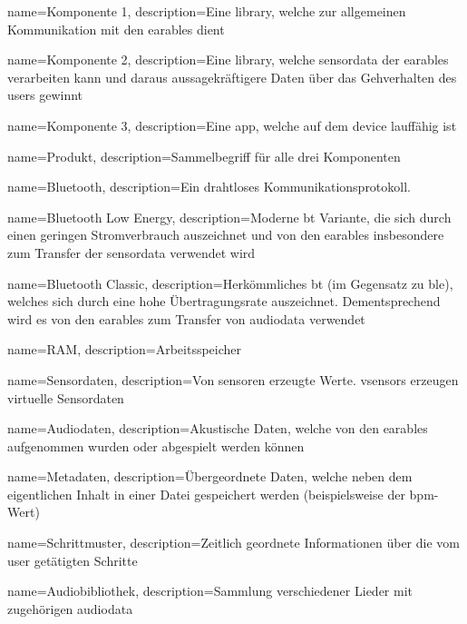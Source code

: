 {
	name=Komponente 1,
	description={Eine \Gls{library}, welche zur allgemeinen Kommunikation mit den \Gls{earable}s dient}
}

{
	name=Komponente 2,
	description={Eine \Gls{library}, welche \Gls{sensordata} der \Gls{earable}s verarbeiten kann und daraus aussagekräftigere Daten über das Gehverhalten des \Gls{user}s gewinnt}
}

{
	name=Komponente 3,
	description={Eine \Gls{app}, welche auf dem \Gls{device} lauffähig ist}
}

{
	name=Produkt,
	description={Sammelbegriff für alle drei Komponenten}
}

{
	name=Bluetooth,
	description={Ein drahtloses Kommunikationsprotokoll. }
}

{
	name=Bluetooth Low Energy,
	description={Moderne \Gls{bt} Variante, die sich durch einen geringen Stromverbrauch auszeichnet und von den \Gls{earable}s insbesondere zum Transfer der \Gls{sensordata} verwendet wird}
}

{
	name=Bluetooth Classic,
	description={Herkömmliches \Gls{bt} (im Gegensatz zu \Gls{ble}), welches sich durch eine hohe Übertragungsrate auszeichnet. Dementsprechend wird es von den \Gls{earable}s zum Transfer von \Gls{audiodata} verwendet}
}

{
	name=RAM,
	description={Arbeitsspeicher}
}

{
	name=Sensordaten,
	description={Von \Gls{sensor}en erzeugte Werte. \glspl{vsensor} erzeugen virtuelle Sensordaten}
}

{
	name=Audiodaten,
	description={Akustische Daten, welche von den \Gls{earable}s aufgenommen wurden oder abgespielt werden können}
}

{
	name=Metadaten,
	description={Übergeordnete Daten, welche neben dem eigentlichen Inhalt in einer Datei gespeichert werden (beispielsweise der \Gls{bpm}-Wert)}
}

{
	name=Schrittmuster,
	description={Zeitlich geordnete Informationen über die vom \Gls{user} getätigten Schritte}
}

{
	name=Audiobibliothek,
	description={Sammlung verschiedener Lieder mit zugehörigen \Gls{audiodata}}
}

